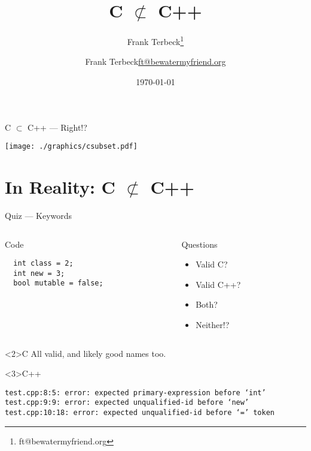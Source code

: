 \documentclass[presentation,aspectratio=169]{beamer}
\author{Frank Terbeck\thanks{ft@bewatermyfriend.org}}
\date{\today}
\title{C \(\not\subset\) C++}
\author{\texorpdfstring{Frank Terbeck\newline\tiny{\url{ft@bewatermyfriend.org}}}{Frank Terbeck}}
\begin{document}
\maketitle

\begin{frame}[label={sec:org2cd0672}]{C \(\subset\) C++ — Right!?}
\begin{center}
\texttt{[image: ./graphics/csubset.pdf]}
\end{center}
\end{frame}

\section{In Reality: C \(\not\subset\) C++}
\label{sec:orgf0e5bbb}


\begin{frame}[fragile,label={sec:org23c4234}]{Quiz — Keywords}
 \begin{columns}
\begin{column}{0.48\columnwidth}
\begin{block}{Code}
\begin{verbatim}
  int class = 2;
  int new = 3;
  bool mutable = false;
\end{verbatim}
\end{block}
\end{column}

\begin{column}{0.48\columnwidth}
\begin{block}{Questions}
\begin{itemize}
\item Valid C?
\item Valid C++?
\item Both?
\item Neither!?
\end{itemize}
\end{block}
\end{column}
\end{columns}

\begin{block}<2>{C}
All valid, and likely good names too.
\end{block}

\vspace{-1cm}
\begin{block}<3>{C++}
\begin{verbatim}
test.cpp:8:5: error: expected primary-expression before ‘int’
test.cpp:9:9: error: expected unqualified-id before ‘new’
test.cpp:10:18: error: expected unqualified-id before ‘=’ token
\end{verbatim}
\end{block}
\end{frame}
\end{document}
